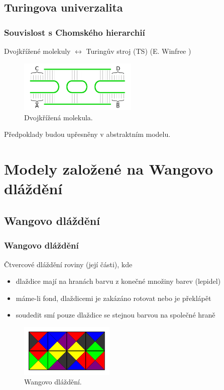 \documentclass[10pt]{beamer}
\theoremstyle{definition}
\theoremstyle{remark}
\begin{document}
\subsection{Turingova univerzalita}
\begin{frame}
\frametitle{Souvislost s Chomského hierarchií}
	Dvojkřížené molekuly $\leftrightarrow$ Turingův stroj (TS) (E. Winfree \cite{winfree_phd})
	\begin{figure}[h]
	\begin{center}
		\includegraphics[width=0.502\textwidth]{../figures/strand_types/double_crossover.pdf} %
		\caption{Dvojkřížená molekula.}
	\end{center}
	\end{figure}
	Předpoklady budou upřesněny v abstraktním modelu.
\end{frame}

\section{Modely založené na Wangovo dláždění}
\subsection{Wangovo dláždění}
\begin{frame}
\frametitle{Wangovo dláždění}
	Čtvercové dláždění roviny (její části), kde
	\begin{itemize}
		\item dlaždice mají na hranách barvu z konečné množiny barev (lepidel)
		\item máme-li fond, dlaždicemi je zakázáno rotovat nebo je překlápět
		\item soudedit smí pouze dlaždice se stejnou barvou na společné hraně
	\end{itemize}
	\begin{figure}[h]
	\begin{center}
		\includegraphics[width=0.4\textwidth]{../figures/wang_tiling/wang_tiling.pdf} %
		\caption{Wangovo dláždění.}
	\end{center}
	\end{figure}
\end{frame}
\end{document}
